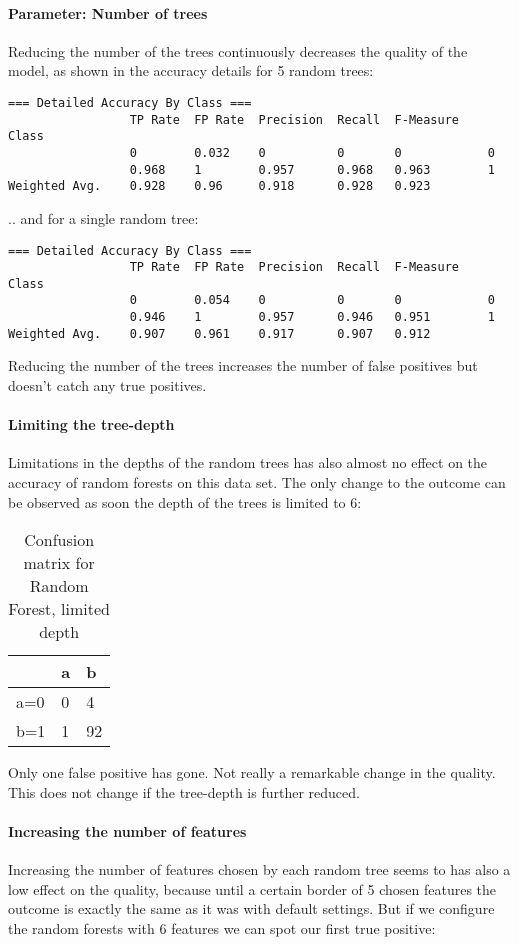 \documentclass[paper=a4, fontsize=11pt]{scrartcl} %
\numberwithin{equation}{section} %
\numberwithin{figure}{section} %
\numberwithin{table}{section} %
\begin{document}
\paragraph{Parameter: Number of trees}
Reducing the number of the trees continuously decreases the quality of the model, as shown in the accuracy details for 5 random trees:
\begin{lstlisting}
=== Detailed Accuracy By Class ===
                 TP Rate  FP Rate  Precision  Recall  F-Measure    Class
                 0        0.032    0          0       0            0  
                 0.968    1        0.957      0.968   0.963        1   
Weighted Avg.    0.928    0.96     0.918      0.928   0.923    
\end{lstlisting}
.. and for a single random tree:
\begin{lstlisting}
=== Detailed Accuracy By Class ===
                 TP Rate  FP Rate  Precision  Recall  F-Measure    Class
                 0        0.054    0          0       0            0  
                 0.946    1        0.957      0.946   0.951        1   
Weighted Avg.    0.907    0.961    0.917      0.907   0.912    
\end{lstlisting}
Reducing the number of the trees increases the number of false positives but doesn't catch any true positives.
\paragraph{Limiting the tree-depth}
Limitations in the depths of the random trees has also almost no effect on the accuracy of random forests on this data set. The only change to the outcome can be observed as soon the depth of the trees is limited to 6:

\begin{table}[h]
\centering
\begin{tabular}{|l|ll|}
\hline
 & a &	b \\
\hline
a=0 & 0 & 4 \\
b=1 & 1 & 92\\
\hline
\end{tabular}
\caption{Confusion matrix for Random Forest, limited depth}
\end{table}

Only one false positive has gone. Not really a remarkable change in the quality. This does not change if the tree-depth is further reduced.
\paragraph{Increasing the number of features}
Increasing the number of features chosen by each random tree seems to has also a low effect on the quality, because until a certain border of 5 chosen features the outcome is exactly the same as it was with default settings. But if we configure the random forests with 6 features we can spot our first true positive:
\end{document}
